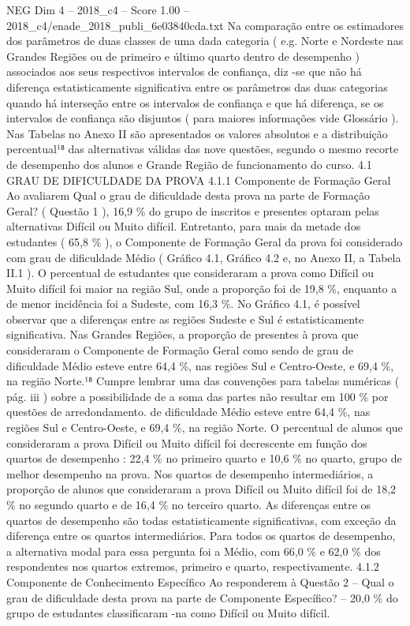 \begin{textsample}{NEG Dim 4 – 2018\_c4 – Score 1.00 – 2018\_c4/enade\_2018\_publi\_6e03840cda.txt}
Na comparação entre os estimadores dos parâmetros de duas classes de uma dada categoria ( e.g.
Norte e Nordeste nas Grandes Regiões ou de primeiro e último quarto dentro de desempenho ) associados aos seus respectivos intervalos de confiança, diz -se que não há diferença estatisticamente significativa entre os parâmetros das duas categorias quando há interseção entre os intervalos de confiança e que há diferença, se os intervalos de confiança são disjuntos ( para maiores informações vide Glossário ).
Nas Tabelas no Anexo II são apresentados os valores absolutos e a distribuição percentual¹⁸ das alternativas válidas das nove questões, segundo o mesmo recorte de desempenho dos alunos e Grande Região de funcionamento do curso. 4.1 GRAU DE DIFICULDADE DA PROVA 4.1.1 Componente de Formação Geral Ao avaliarem Qual o grau de dificuldade desta prova na parte de Formação Geral? ( Questão 1 ), 16,9 \% do grupo de inscritos e presentes optaram pelas alternativas Difícil ou Muito difícil.
Entretanto, para mais da metade dos estudantes ( 65,8 \% ), o Componente de Formação Geral da prova foi considerado com grau de dificuldade Médio ( Gráfico 4.1, Gráfico 4.2 e, no Anexo II, a Tabela II.1 ).
O percentual de estudantes que consideraram a prova como Difícil ou Muito difícil foi maior na região Sul, onde a proporção foi de 19,8 \%, enquanto a de menor incidência foi a Sudeste, com 16,3 \%.
No Gráfico 4.1, é possível observar que a diferenças entre as regiões Sudeste e Sul é estatisticamente significativa.
Nas Grandes Regiões, a proporção de presentes à prova que consideraram o Componente de Formação Geral como sendo de grau de dificuldade Médio esteve entre 64,4 \%, nas regiões Sul e Centro-Oeste, e 69,4 \%, na região Norte.¹⁸ Cumpre lembrar uma das convenções para tabelas numéricas ( pág. iii ) sobre a possibilidade de a soma das partes não resultar em 100 \% por questões de arredondamento. de dificuldade Médio esteve entre 64,4 \%, nas regiões Sul e Centro-Oeste, e 69,4 \%, na região Norte.
O percentual de alunos que consideraram a prova Difícil ou Muito difícil foi decrescente em função dos quartos de desempenho : 22,4 \% no primeiro quarto e 10,6 \% no quarto, grupo de melhor desempenho na prova.
Nos quartos de desempenho intermediários, a proporção de alunos que consideraram a prova Difícil ou Muito difícil foi de 18,2 \% no segundo quarto e de 16,4 \% no terceiro quarto.
As diferenças entre os quartos de desempenho são todas estatisticamente significativas, com exceção da diferença entre os quartos intermediários.
Para todos os quartos de desempenho, a alternativa modal para essa pergunta foi a Médio, com 66,0 \% e 62,0 \% dos respondentes nos quartos extremos, primeiro e quarto, respectivamente. 4.1.2 Componente de Conhecimento Específico Ao responderem à Questão 2 – Qual o grau de dificuldade desta prova na parte de Componente Específico? – 20,0 \% do grupo de estudantes classificaram -na como Difícil ou Muito difícil.

\end{textsample}
